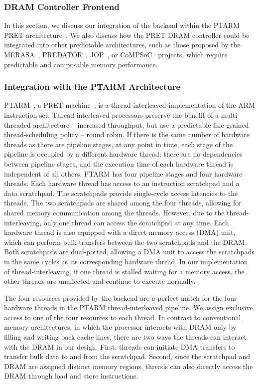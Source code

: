 \subsubsection{DRAM Controller Frontend}

In this section, we discuss our integration of the backend within the PTARM PRET architecture~\cite{Liu10}.
We also  discuss how the PRET DRAM controller could be integrated into other predictable architectures, such as those proposed by the MERASA~\cite{Ungerer10}, PREDATOR~\cite{Wilhelm09}, JOP~\cite{Schoeberl2008265}, or CoMPSoC~\cite{Hansson09} projects, which require predictable and composable memory performance.

\subsubsection{Integration with the PTARM Architecture}

PTARM~\cite{Liu10}, a PRET machine~\cite{Edwards:2007:pret}, is a thread-interleaved implementation of the ARM instruction set.
Thread-interleaved processors preserve the benefit of a multi-threaded architecture -- increased throughput, but use a predictable fine-grained thread-scheduling policy -- round robin.
If there is the same number of hardware threads as there are pipeline stages, at any point in time, each stage of the pipeline is occupied by a different hardware thread; there are no dependencies between pipeline stages, and the execution time of each hardware thread is independent of all others. PTARM has four pipeline stages and four hardware threads.
Each hardware thread has access to an instruction scratchpad and a data scratchpad. 
The scratchpads provide single-cycle access latencies to the threads.
The two scratchpads are shared among the four threads, allowing for shared memory communication among the threads.
However, due to the thread-interleaving, only one thread can access the scratchpad at any time.
Each hardware thread is also equipped with a direct memory access (DMA) unit, which can perform bulk transfers between the two scratchpads and the DRAM.
Both scratchpads are dual-ported, allowing a DMA unit to access the scratchpads in the same cycles as its corresponding hardware thread.
In our implementation of thread-interleaving, if one thread is stalled waiting for a memory access, the other threads are unaffected and continue to execute normally.

The four resources provided by the backend are a perfect match for the four hardware threads in the PTARM thread-interleaved pipeline.
We assign exclusive access to one of the four resources to each thread.
In contrast to conventional memory architectures, in which the processor interacts with DRAM only by filling and writing back cache lines, there are two ways the threads can interact with the DRAM in our design.
First, threads can initiate DMA transfers to transfer bulk data to and from the scratchpad. 
Second, since the scratchpad and DRAM are assigned distinct memory regions, threads can also directly access the DRAM through load and store instructions. 

